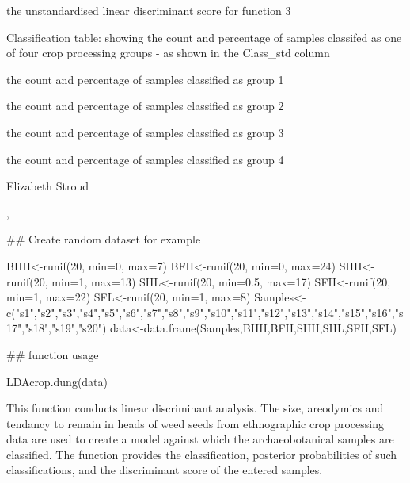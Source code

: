 \documentclass[a4paper]{book}
\begin{document}
\begin{Value}
\begin{ldescription}
\item[\code{LD3*}] the unstandardised linear discriminant score for function 3
\end{ldescription}
Classification table: showing the count and percentage of samples classifed as one of four crop processing groups - as shown in the Class\_std column
\begin{ldescription}
\item[\code{winnowing by-products}] the count and percentage of samples classified as group 1
\item[\code{Coarse-sieving by-products}] the count and percentage of samples classified as group 2
\item[\code{Fine-sieving by-products}] the count and percentage of samples classified as group 3
\item[\code{Fine-sieving products}] the count and percentage of samples classified as group 4
\end{ldescription}
\end{Value}
%
\begin{Author}\relax
Elizabeth Stroud

\end{Author}
%
\begin{SeeAlso}\relax
{}, 

\end{SeeAlso}
%
\begin{Examples}
\begin{ExampleCode}
## Create random dataset for example

BHH<-runif(20, min=0, max=7)
BFH<-runif(20, min=0, max=24)
SHH<-runif(20, min=1, max=13)
SHL<-runif(20, min=0.5, max=17)
SFH<-runif(20, min=1, max=22)
SFL<-runif(20, min=1, max=8)
Samples<-c("s1","s2","s3","s4","s5","s6","s7","s8","s9","s10","s11","s12","s13","s14","s15","s16","s17","s18","s19","s20")
data<-data.frame(Samples,BHH,BFH,SHH,SHL,SFH,SFL)

## function usage

LDAcrop.dung(data)

\end{ExampleCode}
\end{Examples}
%
\begin{Description}\relax
This function conducts linear discriminant analysis. The size, areodymics and tendancy to remain in heads of weed seeds from ethnographic crop processing data are used to create a model against which the archaeobotanical samples are classified. The function provides the classification, posterior probabilities of such classifications, and the discriminant score of the entered samples.
\end{Description}
\end{document}
